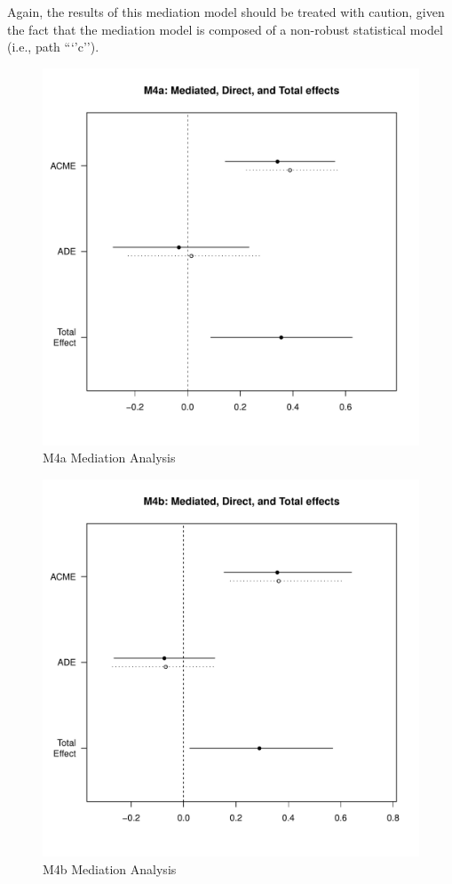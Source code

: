 Again, the results of this mediation model should be treated with caution, given the fact that the mediation model is composed of a non-robust statistical model (i.e., path ```'c'').

\begin{figure}[htbp]
  \centering
  \includegraphics[scale = .5]{images/MLM4aMediationEffects.pdf}
  \caption{M4a Mediation Analysis}
  \label{fig:MLM4aMediationAnalysis}
\end{figure}

\begin{figure}[htbp]
  \centering
  \includegraphics[scale = .5]{images/MLM4bMediationEffects.pdf}
  \caption{M4b Mediation Analysis}
  \label{fig:MLM4bMediationAnalysis}
\end{figure}





